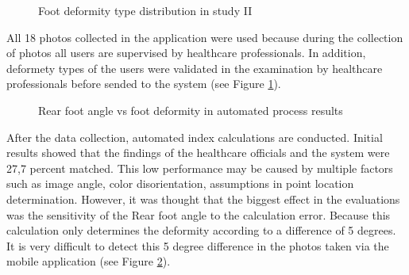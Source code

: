 \begin{figure}[htbp]
\centering
{}
\caption{Foot deformity type distribution in study II}
\label{fig:StudyIIFootDeformityTypeDistribution}
\end{figure} 

All 18 photos collected in the application were used because during the collection of photos all users are supervised by healthcare professionals. In addition, deformety types of the users were validated in the examination by healthcare professionals before sended to the system (see Figure  \ref{fig:StudyIIFootDeformityTypeDistribution}).

\begin{figure}[htbp]
\centering
{}
\caption{Rear foot angle vs foot deformity in automated process results}
\label{fig:StudyIIFootDeformityAutomatedDegreesAndDeformityResults}
\end{figure} 

After the data collection, automated index calculations are conducted. Initial results showed that the findings of the healthcare officials and the system were 27,7 percent matched. This low performance may be caused by multiple factors such as image angle, color disorientation, assumptions in point location determination. However, it was thought that the biggest effect in the evaluations was the sensitivity of the Rear foot angle to the calculation error. Because this calculation only determines the deformity according to a difference of 5 degrees. It is very difficult to detect this 5 degree difference in the photos taken via the mobile application (see Figure \ref{fig:StudyIIFootDeformityAutomatedDegreesAndDeformityResults}). 
